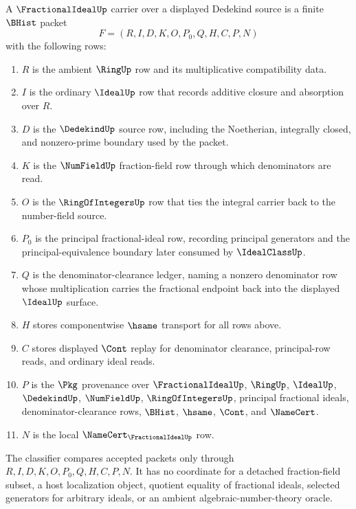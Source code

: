 \begin{definition}\label{def:fractional-ideal-carrier}
A $\FractionalIdealUp$ carrier over a displayed Dedekind source is a finite $\BHist$ packet
$$
F=(R,I,D,K,O,P_0,Q,H,C,P,N)
$$
with the following rows:
\begin{enumerate}
\item $R$ is the ambient $\RingUp$ row and its multiplicative compatibility data.
\item $I$ is the ordinary $\IdealUp$ row that records additive closure and absorption over $R$.
\item $D$ is the $\DedekindUp$ source row, including the Noetherian, integrally closed, and nonzero-prime boundary used by the packet.
\item $K$ is the $\NumFieldUp$ fraction-field row through which denominators are read.
\item $O$ is the $\RingOfIntegersUp$ row that ties the integral carrier back to the number-field source.
\item $P_0$ is the principal fractional-ideal row, recording principal generators and the principal-equivalence boundary later consumed by $\IdealClassUp$.
\item $Q$ is the denominator-clearance ledger, naming a nonzero denominator row whose multiplication carries the fractional endpoint back into the displayed $\IdealUp$ surface.
\item $H$ stores componentwise $\hsame$ transport for all rows above.
\item $C$ stores displayed $\Cont$ replay for denominator clearance, principal-row reads, and ordinary ideal reads.
\item $P$ is the $\Pkg$ provenance over $\FractionalIdealUp$, $\RingUp$, $\IdealUp$, $\DedekindUp$, $\NumFieldUp$, $\RingOfIntegersUp$, principal fractional ideals, denominator-clearance rows, $\BHist$, $\hsame$, $\Cont$, and $\NameCert$.
\item $N$ is the local $\NameCert_{\FractionalIdealUp}$ row.
\end{enumerate}
The classifier compares accepted packets only through $R,I,D,K,O,P_0,Q,H,C,P,N$. It has no coordinate for a detached fraction-field subset, a host localization object, quotient equality of fractional ideals, selected generators for arbitrary ideals, or an ambient algebraic-number-theory oracle.
\end{definition}

